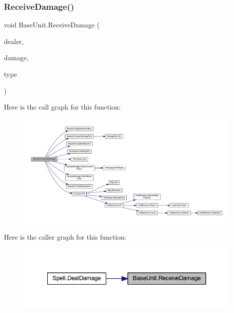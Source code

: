 \subsubsection{\texorpdfstring{ReceiveDamage()}{ReceiveDamage()}}
{\footnotesize\ttfamily void Base\+Unit.\+Receive\+Damage (\begin{DoxyParamCaption}\item[{\mbox{\hyperlink{class_base_unit}{Base\+Unit}}}]{dealer,  }\item[{int}]{damage,  }\item[{\mbox{\hyperlink{class_spell_a3e228beaf92e2c035e6599aaf0ac2d2a}{Spell.\+Damage\+Type}}}]{type }\end{DoxyParamCaption})}

Here is the call graph for this function\+:
\nopagebreak
\begin{figure}[H]
\begin{center}
\leavevmode
\includegraphics[width=350pt]{class_base_unit_a8412f2b3e8ec9c3ff75b41b830fde443_cgraph}
\end{center}
\end{figure}
Here is the caller graph for this function\+:\nopagebreak
\begin{figure}[H]
\begin{center}
\leavevmode
\includegraphics[width=342pt]{class_base_unit_a8412f2b3e8ec9c3ff75b41b830fde443_icgraph}
\end{center}
\end{figure}
\mbox{\label{class_base_unit_a0f900d0c70a2436dd81d8127f8d43336}} 

